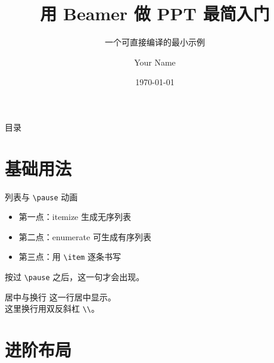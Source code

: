 \documentclass[aspectratio=169, 11pt]{beamer}   %
\title{用 Beamer 做 PPT 最简入门}
\subtitle{一个可直接编译的最小示例}
\author{Your Name}
\institute{Your Institute}
\date{\today}
\begin{document}
\begin{frame}
    \titlepage
\end{frame}

\begin{frame}{目录}
    \tableofcontents
\end{frame}

\section{基础用法}

\begin{frame}{列表与 \texttt{\textbackslash pause} 动画}
    \begin{itemize}
        \item 第一点：itemize 生成无序列表
        \item 第二点：enumerate 可生成有序列表
        \item 第三点：用 \texttt{\textbackslash item} 逐条书写
    \end{itemize}

    \pause   %

    按过 \texttt{\textbackslash pause} 之后，这一句才会出现。
\end{frame}

\begin{frame}{居中与换行}
    \centering
    这一行居中显示。\\
    这里换行用双反斜杠 \texttt{\textbackslash\textbackslash}。
\end{frame}

\section{进阶布局}
\end{document}
